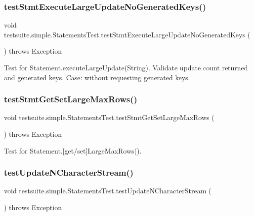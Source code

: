 \subsubsection{\texorpdfstring{test\+Stmt\+Execute\+Large\+Update\+No\+Generated\+Keys()}{testStmtExecuteLargeUpdateNoGeneratedKeys()}}
{\footnotesize\ttfamily void testsuite.\+simple.\+Statements\+Test.\+test\+Stmt\+Execute\+Large\+Update\+No\+Generated\+Keys (\begin{DoxyParamCaption}{ }\end{DoxyParamCaption}) throws Exception}

Test for Statement.\+execute\+Large\+Update(\+String). Validate update count returned and generated keys. Case\+: without requesting generated keys. \mbox{\label{classtestsuite_1_1simple_1_1_statements_test_a0b4ba896da3713e9f09a7af0ecf64115}} 
\subsubsection{\texorpdfstring{test\+Stmt\+Get\+Set\+Large\+Max\+Rows()}{testStmtGetSetLargeMaxRows()}}
{\footnotesize\ttfamily void testsuite.\+simple.\+Statements\+Test.\+test\+Stmt\+Get\+Set\+Large\+Max\+Rows (\begin{DoxyParamCaption}{ }\end{DoxyParamCaption}) throws Exception}

Test for Statement.\mbox{[}get/set\mbox{]}Large\+Max\+Rows(). \mbox{\label{classtestsuite_1_1simple_1_1_statements_test_a3d0a79f353f51403a5d7d3f0af149ad3}} 
\subsubsection{\texorpdfstring{test\+Update\+N\+Character\+Stream()}{testUpdateNCharacterStream()}}
{\footnotesize\ttfamily void testsuite.\+simple.\+Statements\+Test.\+test\+Update\+N\+Character\+Stream (\begin{DoxyParamCaption}{ }\end{DoxyParamCaption}) throws Exception}

